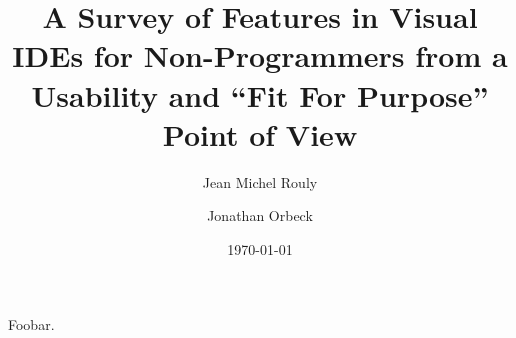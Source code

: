 \documentclass[letterpaper,10pt]{article}
\title{\textbf{A Survey of Features in Visual IDEs for Non-Programmers from a Usability and ``Fit For Purpose'' Point of View}}
\author{Jean Michel Rouly \and Jonathan Orbeck}
\date{\today}
\begin{document}
\maketitle

Foobar.

\clearpage


\end{document}
